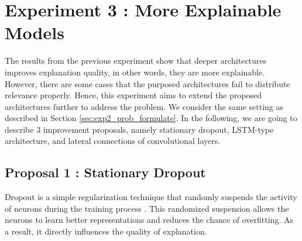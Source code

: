 \section{Experiment 3 : More Explainable Models}
The results from the previous experiment show that deeper architectures improves explanation quality, in other words, they are more explainable. However, there are some cases that the purposed architectures fail to distribute relevance properly.  Hence, this experiment aims to extend the proposed architectures further to address the problem. We consider the same setting as described in Section \ref{sec:exp2_prob_formulate}. In the following, we are going to describe 3 improvement proposals, namely stationary dropout, LSTM-type architecture,  and lateral connections of convolutional layers.


\subsection{Proposal 1 :  Stationary Dropout}
Dropout is a simple regularization technique that randomly suspends the activity of neurons during the training process\citep{SrivastavaDropoutSimpleWay2014} . This randomized suspension allows the neurons to learn better representations and reduces the chance of overfitting.  As a result, it directly influences the quality of explanation. 





\begin{figure}[!htb]
\centering
{} 

\label{fig:dropout_lstm}
\end{figure}

